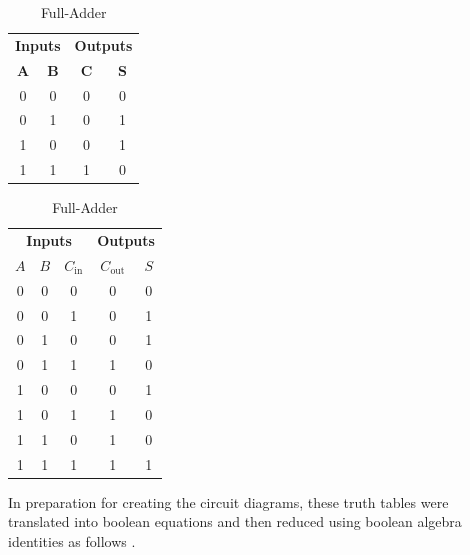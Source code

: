 \documentclass[11pt, letterpaper]{article} %
\begin{document}
\begin{table}[h]\centering
    \caption{Prelab Truth Tables.}
    \def\arraystretch{1.2}
    \begin{subtable}[t]{0.48\linewidth}\centering
        \caption{Half-Adder}
        \begin{tabular}{|cc|cc|}
            \hline
            \multicolumn{2}{|m{1.5cm}|}{\bfseries\centering Inputs} & 
            \multicolumn{2}{m{1.5cm}|}{\bfseries\centering Outputs}\\
            $\boldsymbol{A}$ & $\boldsymbol{B}$ & $\boldsymbol{C}$ & $\boldsymbol{S}$\\
            \hline
            0 & 0 & 0 & 0\\
            0 & 1 & 0 & 1\\
            1 & 0 & 0 & 1\\
            1 & 1 & 1 & 0\\
            \hline
        \end{tabular}
    \end{subtable}
    \hfill\null
    \begin{subtable}[t]{0.48\linewidth}\centering
        \caption{Full-Adder}
        \begin{tabular}{|ccc|cc|}
            \hline
            \multicolumn{3}{|m{2.25cm}|}{\bfseries\centering Inputs} & 
            \multicolumn{2}{m{1.5cm}|}{\bfseries\centering Outputs}\\
            $A$ & $B$ &  $C_\mathrm{in}$ & $C_\mathrm{out}$ & $S$\\
            \hline
            0 & 0 & 0 & 0 & 0\\
            0 & 0 & 1 & 0 & 1\\
            0 & 1 & 0 & 0 & 1\\
            0 & 1 & 1 & 1 & 0\\
            1 & 0 & 0 & 0 & 1\\
            1 & 0 & 1 & 1 & 0\\
            1 & 1 & 0 & 1 & 0\\
            1 & 1 & 1 & 1 & 1\\
            \hline
        \end{tabular}
    \end{subtable}
\end{table}

In preparation for creating the circuit diagrams, these truth tables were translated into boolean equations and then reduced using boolean algebra identities as follows \cite{fell-discrete-structure}.
\end{document}

